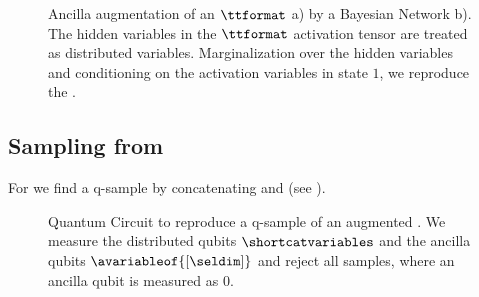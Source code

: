 \begin{figure}[t]
    \begin{center}
        
    \end{center}
    \caption{Ancilla augmentation of an $\ttformat$ \ComputationActivationNetwork{} a) by a Bayesian Network b).
    The hidden variables in the $\ttformat$ activation tensor are treated as distributed variables.
    Marginalization over the hidden variables and conditioning on the activation variables in state $1$, we reproduce the \ComputationActivationNetwork{}.}
    \label{fig:canTTAugmentation}
\end{figure}

\subsection{Sampling from \ComputationActivationNetworks{}}

For \ComputationActivationNetworks{} we find a q-sample by concatenating \computationCircuits{} and \activationCircuits{} (see ).

\begin{figure}
    \begin{center}
        
    \end{center}
    \caption{
        Quantum Circuit to reproduce a q-sample of an augmented \ComputationActivationNetwork{}.
        We measure the distributed qubits $\shortcatvariables$ and the ancilla qubits $\avariableof{[\seldim]}$ and reject all samples, where an ancilla qubit is measured as $0$.
    }\label{fig:caCircuit}
\end{figure}

